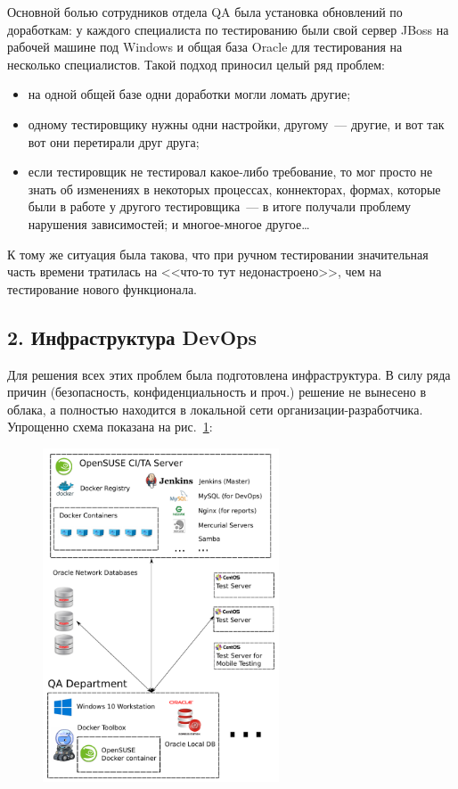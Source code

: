 \documentclass[10pt, a5paper]{article}
\begin{document}
Основной болью сотрудников отдела QA была установка обновлений по доработкам: у каждого специалиста по тестированию были свой сервер JBoss на рабочей машине под Windows и общая база Oracle для тестирования на несколько специалистов. Такой подход приносил целый ряд проблем:

\begin{itemize}
  \item на одной общей базе одни доработки могли ломать другие;
  \item одному тестировщику нужны одни настройки, другому~--- другие, и вот так вот они перетирали друг друга;
  \item если тестировщик не тестировал какое-либо требование, то мог просто не знать об изменениях в некоторых процессах, коннекторах, формах, которые были в работе у другого тестировщика~--- в итоге получали проблему нарушения зависимостей;
и многое-многое другое\ldots{}
\end{itemize}

К тому же ситуация была такова, что при ручном тестировании значительная часть времени тратилась на <<что-то тут недонастроено>>, чем на тестирование нового функционала.

\subsection*{2. Инфраструктура DevOps}

Для решения всех этих проблем была подготовлена инфраструктура. В силу ряда причин (безопасность, конфиденциальность и проч.) решение не вынесено в облака, а полностью находится в локальной сети организации-разработчика. Упрощенно схема показана на рис.~\ref{Gagarin2}:

\begin{center}
\begin{figure}[h!]
  \centering
  \includegraphics[width=7cm]{13_2018_Gagarin2}
  \caption{~}
  \label{Gagarin2}
\end{figure}
\end{center} 
\end{document}
